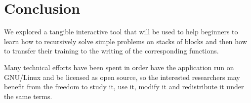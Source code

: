 
\section{Conclusion}

We explored a tangible interactive tool that will be used to help
beginners to learn how to recursively solve simple problems on stacks
of blocks and then how to transfer their training to the writing of
the corresponding \erlang functions.

Many technical efforts have been spent in order have the application
run on \textsf{GNU/Linux} and be licensed as open source, so the
interested researchers may benefit from the freedom to study it, use
it, modify it and redistribute it under the same terms.
